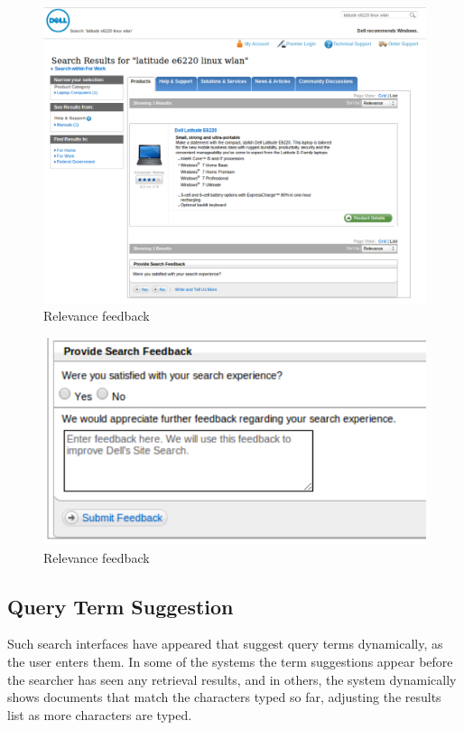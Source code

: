 \documentclass{sigchi}
\begin{document}
\begin{figure}[htp] %
\caption{Relevance feedback \protect} \label{figure_relevanceFeedback1}
\includegraphics[scale=0.28]{figures/relevanceFeedback1.pdf} 
\end{figure}

\begin{figure}[htp] %
\caption{Relevance feedback \protect} \label{figure_relevanceFeedback2}
\includegraphics[scale=0.70]{figures/relevanceFeedback2.pdf} 
\end{figure}

\subsection{Query Term Suggestion}

Such search interfaces have appeared that suggest query terms dynamically, as the user enters them. In some of the systems the term suggestions appear before the searcher has seen any retrieval results, and in others, the system dynamically shows documents that match the characters typed so far, adjusting the results list as more characters are typed. 
\end{document}
